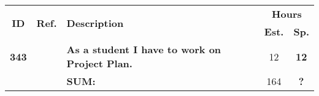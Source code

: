 \label{tab:sprint1Documentationstories}
\def\arraystretch{1.25}
 
\begin{longtable}{ccXcc}

\toprule[0.5mm]
\multirow{2}{*}{\textbf{ID}} &
\multirow{2}{*}{\textbf{Ref.}} & \multirow{2}{*}{\textbf{Description}} & \multicolumn{2}{c}{\textbf{Hours}} \\
 					& & & \textbf{Est.} & \textbf{Sp.} \\
\midrule
\textbf{343} 	&& {\bf As a student I have to work on Project Plan.} 	& 		12	& \textbf{12} \\
							
				
\hline
				&& \textbf{SUM:}		&		164	& \textbf{?}
 \\																			
\bottomrule[0.5mm]
\end{longtable}
